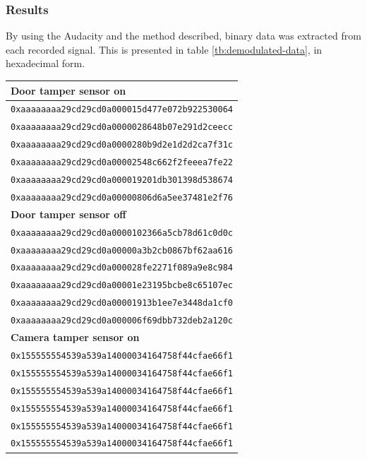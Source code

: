 \subsubsection{Results}
By using the Audacity and the method described, binary data was extracted from each recorded signal. This is presented in table \ref{tb:demodulated-data}, in hexadecimal form.
\begin{table}[!p]
    \centering
    \begin{tabularx}{\textwidth}{l}
        \hline
        \textbf{Door tamper sensor on} \\ \hline
        \texttt{0xaaaaaaaa29cd29cd0a000015d477e072b922530064} \\
        \texttt{0xaaaaaaaa29cd29cd0a0000028648b07e291d2ceecc} \\
        \texttt{0xaaaaaaaa29cd29cd0a0000280b9d2e1d2d2ca7f31c} \\
        \texttt{0xaaaaaaaa29cd29cd0a00002548c662f2feeea7fe22} \\
        \texttt{0xaaaaaaaa29cd29cd0a000019201db301398d538674} \\
        \texttt{0xaaaaaaaa29cd29cd0a00000806d6a5ee37481e2f76} \\
        \hline
        
        \textbf{Door tamper sensor off} \\ \hline
        \texttt{0xaaaaaaaa29cd29cd0a0000102366a5cb78d61c0d0c} \\
        \texttt{0xaaaaaaaa29cd29cd0a00000a3b2cb0867bf62aa616} \\
        \texttt{0xaaaaaaaa29cd29cd0a000028fe2271f089a9e8c984} \\
        \texttt{0xaaaaaaaa29cd29cd0a00001e23195bcbe8c65107ec} \\
        \texttt{0xaaaaaaaa29cd29cd0a00001913b1ee7e3448da1cf0} \\
        \texttt{0xaaaaaaaa29cd29cd0a000006f69dbb732deb2a120c} \\
        \hline
        
        \textbf{Camera tamper sensor on} \\ \hline
        \texttt{0x155555554539a539a14000034164758f44cfae66f1} \\
        \texttt{0x155555554539a539a14000034164758f44cfae66f1} \\
        \texttt{0x155555554539a539a14000034164758f44cfae66f1} \\
        \texttt{0x155555554539a539a14000034164758f44cfae66f1} \\
        \texttt{0x155555554539a539a14000034164758f44cfae66f1} \\
        \texttt{0x155555554539a539a14000034164758f44cfae66f1} \\
        \hline
        

\end{tabularx}
\end{table}

